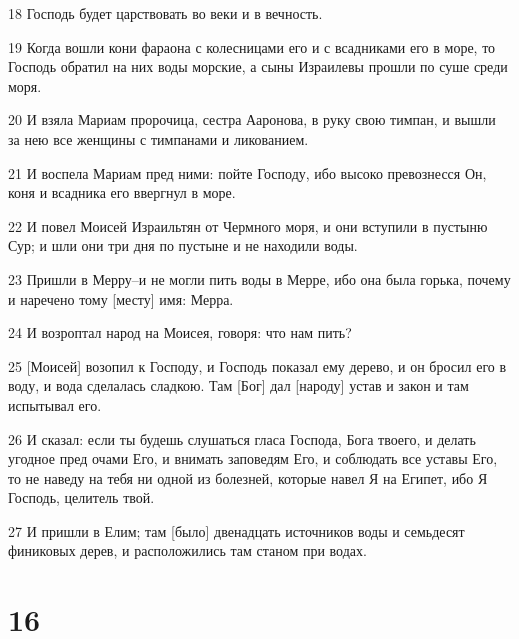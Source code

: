 \par 18 Господь будет царствовать во веки и в вечность.
\par 19 Когда вошли кони фараона с колесницами его и с всадниками его в море, то Господь обратил на них воды морские, а сыны Израилевы прошли по суше среди моря.
\par 20 И взяла Мариам пророчица, сестра Ааронова, в руку свою тимпан, и вышли за нею все женщины с тимпанами и ликованием.
\par 21 И воспела Мариам пред ними: пойте Господу, ибо высоко превознесся Он, коня и всадника его ввергнул в море.
\par 22 И повел Моисей Израильтян от Чермного моря, и они вступили в пустыню Сур; и шли они три дня по пустыне и не находили воды.
\par 23 Пришли в Мерру--и не могли пить воды в Мерре, ибо она была горька, почему и наречено тому [месту] имя: Мерра.
\par 24 И возроптал народ на Моисея, говоря: что нам пить?
\par 25 [Моисей] возопил к Господу, и Господь показал ему дерево, и он бросил его в воду, и вода сделалась сладкою. Там [Бог] дал [народу] устав и закон и там испытывал его.
\par 26 И сказал: если ты будешь слушаться гласа Господа, Бога твоего, и делать угодное пред очами Его, и внимать заповедям Его, и соблюдать все уставы Его, то не наведу на тебя ни одной из болезней, которые навел Я на Египет, ибо Я Господь, целитель твой.
\par 27 И пришли в Елим; там [было] двенадцать источников воды и семьдесят финиковых дерев, и расположились там станом при водах.

\chapter{16}

